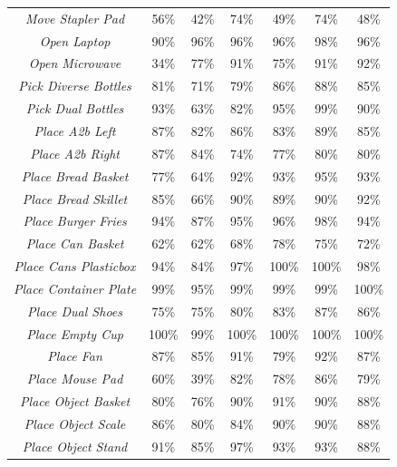 \begin{table}[t]
\begin{tabular}{ccccccc}
    \textit{Move Stapler Pad} & 56\%    & 42\%    & 74\%    & 49\%    & 74\%    & 48\% \\
    \textit{Open Laptop} & 90\%    & 96\%    & 96\%    & 96\%    & 98\%    & 96\% \\
    \textit{Open Microwave} & 34\%    & 77\%    & 91\%    & 75\%    & 91\%    & 92\% \\
    \textit{Pick Diverse Bottles} & 81\%    & 71\%    & 79\%    & 86\%    & 88\%    & 85\% \\
    \textit{Pick Dual Bottles} & 93\%    & 63\%    & 82\%    & 95\%    & 99\%    & 90\% \\
    \textit{Place A2b Left} & 87\%    & 82\%    & 86\%    & 83\%    & 89\%    & 85\% \\
    \textit{Place A2b Right} & 87\%    & 84\%    & 74\%    & 77\%    & 80\%    & 80\% \\
    \textit{Place Bread Basket} & 77\%    & 64\%    & 92\%    & 93\%    & 95\%    & 93\% \\
    \textit{Place Bread Skillet} & 85\%    & 66\%    & 90\%    & 89\%    & 90\%    & 92\% \\
    \textit{Place Burger Fries} & 94\%    & 87\%    & 95\%    & 96\%    & 98\%    & 94\% \\
    \textit{Place Can Basket} & 62\%    & 62\%    & 68\%    & 78\%    & 75\%    & 72\% \\
    \textit{Place Cans Plasticbox} & 94\%    & 84\%    & 97\%    & 100\%   & 100\%   & 98\% \\
    \textit{Place Container Plate} & 99\%    & 95\%    & 99\%    & 99\%    & 99\%    & 100\% \\
    \textit{Place Dual Shoes} & 75\%    & 75\%    & 80\%    & 83\%    & 87\%    & 86\% \\
    \textit{Place Empty Cup} & 100\%   & 99\%    & 100\%   & 100\%   & 100\%   & 100\% \\
    \textit{Place Fan} & 87\%    & 85\%    & 91\%    & 79\%    & 92\%    & 87\% \\
    \textit{Place Mouse Pad} & 60\%    & 39\%    & 82\%    & 78\%    & 86\%    & 79\% \\
    \textit{Place Object Basket} & 80\%    & 76\%    & 90\%    & 91\%    & 90\%    & 88\% \\
    \textit{Place Object Scale} & 86\%    & 80\%    & 84\%    & 90\%    & 90\%    & 88\% \\
    \textit{Place Object Stand} & 91\%    & 85\%    & 97\%    & 93\%    & 93\%    & 88\% \\

\end{tabular}
\end{table}
